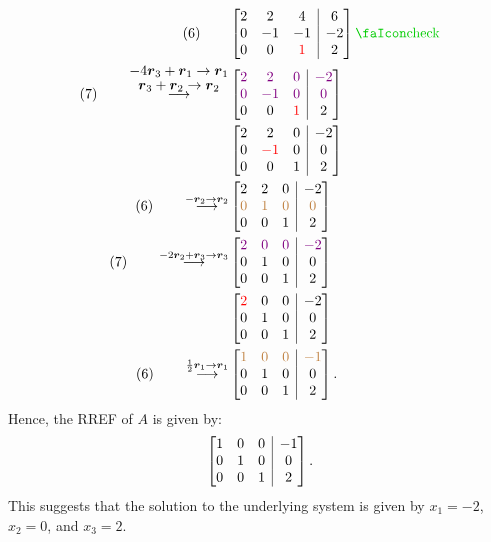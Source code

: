 \begin{enumerate}
\begin{align*}
(6)\qquad&
\left[\begin{array}{@{}ccc|c@{}}
2&2&4&6\\
0&-1&-1&-2\\
0&0&\rc{1}&2\\
\end{array}\right]\text{\cmark}\\
(7)\qquad\overset{\stackon{\(\vect{r}_{3}+\vect{r}_{2}\to\vect{r}_{2}\)}
{\(-4\vect{r}_{3}+\vect{r}_{1}\to\vect{r}_{1}\)}}{\longrightarrow}&
\left[\begin{array}{@{}ccc|c@{}}
\vc{2}&\vc{2}&\vc{0}&\vc{-2}\\
\vc{0}&\vc{-1}&\vc{0}&\vc{0}\\
0&0&\rc{1}&2\\
\end{array}\right]\\
&
\left[\begin{array}{@{}ccc|c@{}}
2&2&0&-2\\
0&\rc{-1}&0&0\\
0&0&1&2\\
\end{array}\right]\\
(6)\qquad\overset{-\vect{r}_{2}\to\vect{r}_{2}}{\longrightarrow}&\left[\begin{array}{@{}ccc|c@{}}
2&2&0&-2\\
\brc{0}&\brc{1}&\brc{0}&\brc{0}\\
0&0&1&2\\
\end{array}\right]\\
(7)\qquad\overset{-2\vect{r}_{2}+\vect{r}_{3}\to\vect{r}_{3}}{\longrightarrow}&\left[\begin{array}{@{}ccc|c@{}}
\vc{2}&\vc{0}&\vc{0}&\vc{-2}\\
0&1&0&0\\
0&0&1&2\\
\end{array}\right]\\
&\left[\begin{array}{@{}ccc|c@{}}
\rc{2}&0&0&-2\\
0&1&0&0\\
0&0&1&2\\
\end{array}\right]\\
(6)\qquad\overset{\frac{1}{2}\vect{r}_{1}\to\vect{r}_{1}}{\longrightarrow}
&\left[\begin{array}{@{}ccc|c@{}}
\brc{1}&\brc{0}&\brc{0}&\brc{-1}\\
0&1&0&0\\
0&0&1&2\\
\end{array}\right].
\end{align*}
Hence, the RREF of \(A\) is given by:
\[
\left[\begin{array}{@{}ccc|c@{}}
1&0&0&-1\\
0&1&0&0\\
0&0&1&2\\
\end{array}\right].
\]
This suggests that the solution to the underlying system is given by
\(x_1=-2\), \(x_2=0\), and \(x_3=2\).


\end{enumerate}
